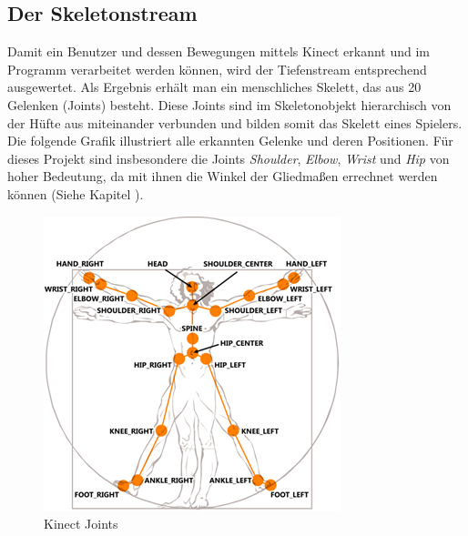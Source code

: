%
%
\subsection{Der Skeletonstream}\label{skeleton}
Damit ein Benutzer und dessen Bewegungen mittels Kinect erkannt und im Programm verarbeitet werden können, wird der Tiefenstream entsprechend ausgewertet. Als Ergebnis erhält man ein menschliches Skelett, das aus
20 Gelenken (Joints) besteht. Diese Joints sind im Skeletonobjekt hierarchisch von der Hüfte aus miteinander verbunden und bilden somit das Skelett eines Spielers. Die folgende Grafik illustriert alle erkannten Gelenke und deren Positionen. Für dieses Projekt sind insbesondere die Joints \textit{Shoulder}, \textit{Elbow}, \textit{Wrist} und \textit{Hip} von hoher Bedeutung, da mit ihnen die Winkel der Gliedmaßen errechnet werden können (Siehe Kapitel ).

\begin{figure}[H]						
	\centering							
	\includegraphics[scale=1.0]{Bilder/kinect_joints.png}			
	\caption{Kinect Joints \cite{ws:microsoft_jointType}}						
	\label{f:kinect_joints}						
\end{figure}

